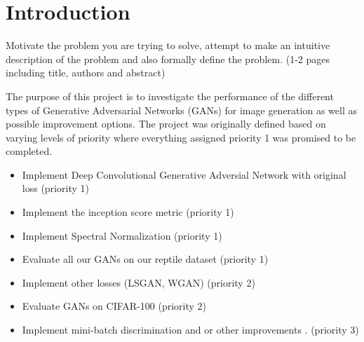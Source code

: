 \section{Introduction}
Motivate the problem you are trying to solve, attempt to make an intuitive description of the problem and also formally define the problem. (1-2 pages including title, authors and abstract)


 


The purpose of this project is to investigate the performance of the different types of Generative Adversarial Networks (GANs) \cite{goodfellow2014generative} for image generation as well as possible improvement options.
The project was originally defined based on varying levels of priority where everything assigned priority 1 was promised to be completed.

\begin{itemize}
	\item Implement Deep Convolutional Generative Adversial Network with original loss \cite{DBLP:journals/corr/RadfordMC15} (priority 1)
	\item Implement the inception score metric \cite{salimans2016improved} (priority 1)
	\item Implement Spectral Normalization (priority 1)
	\item Evaluate all our GANs on our reptile dataset (priority 1)
	\item Implement other losses (LSGAN, WGAN) \cite{mao2017least} (priority 2)
	\item Evaluate GANs on CIFAR-100 (priority 2)
	\item Implement mini-batch discrimination and or other improvements \cite{salimans2016improved}. (priority 3)
\end{itemize}

